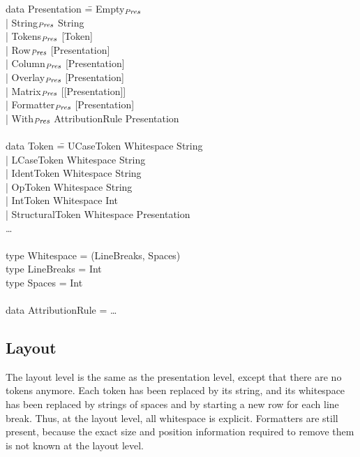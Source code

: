 \documentclass{speauth}
\begin{document}
\noindent
\ttfamily
\begin{tabbing}
data Presentation \= = Empty$_{\mathit{Pres}}$\\
                  \> | String$_{\mathit{Pres}}$ String \\
                  \> | Tokens$_{\mathit{Pres}}$ [Token]\\
                  \> | Row$_{\mathit{Pres}}$ [Presentation]\\
                  \> | Column$_{\mathit{Pres}}$ [Presentation]\\
                  \> | Overlay$_{\mathit{Pres}}$ [Presentation]\\
                  \> | Matrix$_{\mathit{Pres}}$ [[Presentation]]\\
                  \> | Formatter$_{\mathit{Pres}}$ [Presentation]\\
                  \> | With$_{\mathit{Pres}}$ AttributionRule Presentation\\
\\
data Token \= = UCaseToken Whitespace String\\
           \> | LCaseToken Whitespace String\\
           \> | IdentToken Whitespace String\\
           \> | OpToken Whitespace String\\
           \> | IntToken Whitespace Int\\
           \> | StructuralToken Whitespace Presentation\\
           \> \dots \\
\\
type Whitespace = (LineBreaks, Spaces)\\
type LineBreaks = Int\\
type Spaces = Int\\
\\
data AttributionRule = \dots\\
\end{tabbing}
\rmfamily


%																
\subsection{Layout}

The layout level is the same as the presentation level, except that there are no tokens anymore. Each token has been replaced by its string, and its whitespace has been replaced by strings of spaces and by starting a new row for each line break. Thus, at the layout level, all whitespace is explicit. Formatters are still present, because the exact size and position information required to remove them is not known at the layout level.
\end{document}
